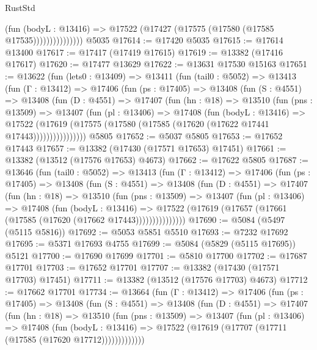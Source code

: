 \begin{lexlean}{RustStd}
\begin{coremodule}
                        (fun (bodyL : @13416) =>
                        @17522 (@17427 (@17575 (@17580 (@17585 @17535)))))))))))))))
    @5035
@17614 := @17420 @5035
@17615 := @17614 @13400
@17617 := @17417 (@17419 @17615)
@17619 := @13382 (@17416 @17617)
@17620 := @17477 @13629
@17622 := @13631 @17530 @15163
@17651 := @13622
    (fun (lets0 : @13409) =>
    @13411
      (fun (tail0 : @5052) =>
      @13413
        (fun (Γ : @13412) =>
        @17406
          (fun (ps : @17405) =>
          @13408
            (fun (S : @4551) =>
            @13408
              (fun (D : @4551) =>
              @17407
                (fun (hn : @18) =>
                @13510
                  (fun (pns : @13509) =>
                  @13407
                    (fun (pl : @13406) =>
                    @17408
                      (fun (bodyL : @13416) =>
                      @17522
                        (@17619
                          (@17575 (@17580 (@17585 (@17620 (@17622 @17441 @17443))))))))))))))))
    @5805
@17652 := @5037 @5805
@17653 := @17652 @17443
@17657 := @13382 (@17430 (@17571 @17653) @17451)
@17661 := @13382 (@13512 (@17576 @17653) @4673)
@17662 := @17622 @5805
@17687 := @13646
    (fun (tail0 : @5052) =>
    @13413
      (fun (Γ : @13412) =>
      @17406
        (fun (ps : @17405) =>
        @13408
          (fun (S : @4551) =>
          @13408
            (fun (D : @4551) =>
            @17407
              (fun (hn : @18) =>
              @13510
                (fun (pns : @13509) =>
                @13407
                  (fun (pl : @13406) =>
                  @17408
                    (fun (bodyL : @13416) =>
                    @17522 (@17619 (@17657 (@17661 (@17585 (@17620 (@17662 @17443)))))))))))))))
@17690 := @5084 (@5497 (@5115 @5816))
@17692 := @5053 @5851 @5510
@17693 := @7232 @17692
@17695 := @5371 @17693 @4755
@17699 := @5084 (@5829 (@5115 @17695)) @5121
@17700 := @17690 @17699
@17701 := @5810 @17700
@17702 := @17687 @17701
@17703 := @17652 @17701
@17707 := @13382 (@17430 (@17571 @17703) @17451)
@17711 := @13382 (@13512 (@17576 @17703) @4673)
@17712 := @17662 @17701
@17734 := @13664
    (fun (Γ : @13412) =>
    @17406
      (fun (ps : @17405) =>
      @13408
        (fun (S : @4551) =>
        @13408
          (fun (D : @4551) =>
          @17407
            (fun (hn : @18) =>
            @13510
              (fun (pns : @13509) =>
              @13407
                (fun (pl : @13406) =>
                @17408
                  (fun (bodyL : @13416) =>
                  @17522 (@17619 (@17707 (@17711 (@17585 (@17620 @17712)))))))))))))

\end{coremodule}
\end{lexlean}
